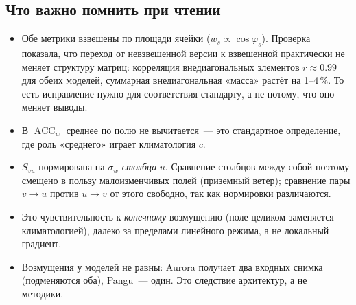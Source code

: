 \documentclass[11pt]{article}
\begin{document}
\subsection*{Что важно помнить при чтении}

\begin{itemize}
\item Обе метрики взвешены по площади ячейки ($w_s\propto\cos\varphi_s$). Проверка показала,
      что переход от невзвешенной версии к взвешенной практически не меняет структуру матриц:
      корреляция внедиагональных элементов $r \approx 0.99$ для обеих моделей, суммарная
      внедиагональная «масса» растёт на 1--4\,\%. То есть исправление нужно для соответствия
      стандарту, а не потому, что оно меняет выводы.
\item В $\operatorname{ACC}_w$ среднее по полю не вычитается~--- это стандартное определение,
      где роль «среднего» играет климатология $\bar c$.
\item $S_{vu}$ нормирована на $\sigma_w$ \emph{столбца} $u$. Сравнение столбцов между собой
      поэтому смещено в пользу малоизменчивых полей (приземный ветер); сравнение пары
      $v\!\to\!u$ против $u\!\to\!v$ от этого свободно, так как нормировки различаются.
\item Это чувствительность к \emph{конечному} возмущению (поле целиком заменяется
      климатологией), далеко за пределами линейного режима, а не локальный градиент.
\item Возмущения у моделей не равны: Aurora получает два входных снимка (подменяются оба),
      Pangu~--- один. Это следствие архитектур, а не методики.
\end{itemize}
\end{document}
